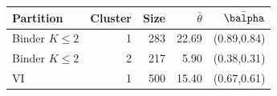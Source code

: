 \begin{tabular}{lrrrr}
\hline\hline
Partition & Cluster & Size & $\bar\theta$ & $\bar\balpha$ \\
\hline
Binder $K\leq2$ & 1 & 283 & 22.69 & (0.89,0.84) \\
Binder $K\leq2$ & 2 & 217 & 5.90 & (0.38,0.31) \\
VI & 1 & 500 & 15.40 & (0.67,0.61) \\
\hline\hline
\end{tabular}
